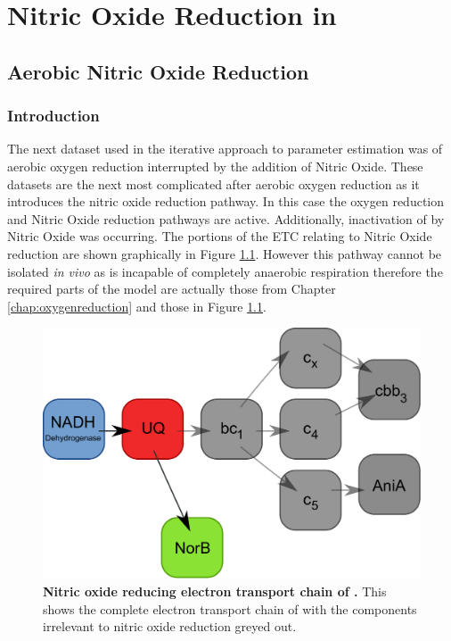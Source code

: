 \chapter{Nitric Oxide Reduction in \Nm{}}
\label{chap:noreduction}
\section{Aerobic Nitric Oxide Reduction}
\subsection{Introduction}
The next dataset used in the iterative approach to parameter estimation was of aerobic oxygen reduction interrupted by the addition of Nitric Oxide. These datasets are the next most complicated after aerobic oxygen reduction as it introduces the nitric oxide reduction pathway. In this case the oxygen reduction and Nitric Oxide reduction pathways are active. Additionally, inactivation of \cbbthree{} by Nitric Oxide was occurring. The portions of the ETC relating to Nitric Oxide reduction are shown graphically in Figure \ref{fig:no_resp_chain}. However this pathway cannot be isolated \textit{in vivo} as \Nm{} is incapable of completely anaerobic respiration therefore the required parts of the model are actually those from Chapter \ref{chap:oxygenreduction} and those in Figure \ref{fig:no_resp_chain}.
\begin{figure}[tbp]
  \centering
    \includegraphics[width=14cm]{06-noreduction/data/no_resp_chain.pdf}
    \caption[Nitric oxide reducing electron transport chain of \Nm{}]{{\bf Nitric oxide reducing electron transport chain of \Nm{}.} This shows the complete electron transport chain of \Nsm{} with the components irrelevant to nitric oxide reduction greyed out.
  \label{fig:no_resp_chain}}
\end{figure}\\
